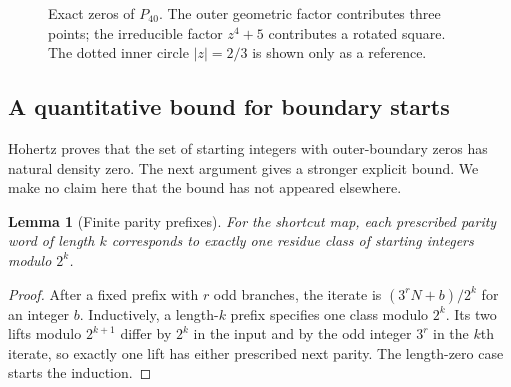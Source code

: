 \documentclass[11pt,a4paper]{article}
\newtheorem{lemma}[theorem]{Lemma}
\theoremstyle{definition}
\theoremstyle{remark}
\numberwithin{equation}{section}
\begin{document}
\begin{figure}[htbp]
\centering
{}
\caption{Exact zeros of $P_{40}$. The outer geometric factor contributes
three points; the irreducible factor $z^4+5$ contributes a rotated square.
The dotted inner circle $|z|=2/3$ is shown only as a reference.}
\end{figure}
\subsection{A quantitative bound for boundary starts}
Hohertz proves that the set of starting integers with outer-boundary zeros
has natural density zero. The next argument gives a stronger explicit bound.
We make no claim here that the bound has not appeared elsewhere.

\begin{lemma}[Finite parity prefixes]\label{C:lem:boundary-parity}
For the shortcut map, each prescribed parity word of length $k$ corresponds
to exactly one residue class of starting integers modulo $2^k$.
\end{lemma}

\begin{proof}
After a fixed prefix with $r$ odd branches, the iterate is
$(3^rN+b)/2^k$ for an integer $b$. Inductively, a length-$k$ prefix
specifies one class modulo $2^k$. Its two lifts modulo $2^{k+1}$
differ by $2^k$ in the input and by the odd integer $3^r$ in the
$k$th iterate, so exactly one lift has either prescribed next parity.
The length-zero case starts the induction.
\end{proof}
\end{document}
